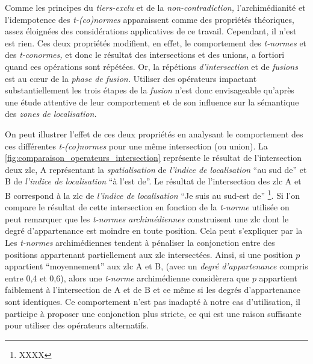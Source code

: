 Comme les principes du \emph{tiers-exclu} et de la
\emph{non-contradiction,} l'archimédianité et l'idempotence des
\emph{t-(co)normes} apparaissent comme des propriétés théoriques,
assez éloignées des considérations applicatives de ce
travail. Cependant, il n'est est rien. Ces deux propriétés modifient,
en effet, le comportement des \emph{t-normes} et des
\emph{t-conormes,} et donc le résultat des intersections et des
unions, a fortiori quand ces opérations sont répétées. Or, la
répétions \emph{d'intersection} et de \emph{fusions} est au cœur de la
\emph{phase de fusion.} Utiliser des opérateurs impactant
substantiellement les trois étapes de la \emph{fusion} n'est donc
envisageable qu'après une étude attentive de leur comportement et de
son influence sur la sémantique des \emph{zones de localisation.}


On peut illustrer l'effet de ces deux propriétés en analysant le
comportement des ces différentes \emph{t-(co)normes} pour une même
intersection (ou union). La
\autoref{fig:comparaison_operateurs_intersection} représente le
résultat de l'intersection deux \ac{zlc},
\textcolor{RdBu-9-1}{\textsf{A}} représentant la \emph{spatialisation}
de \emph{l'indice de localisation} \enquote{au sud de} et
\textcolor{RdBu-9-9}{\textsf{B}} de \emph{l'indice de localisation}
\enquote{à l'est de}. Le résultat de l'intersection des \ac{zlc}
\textcolor{RdBu-9-1}{\textsf{A}} et \textcolor{RdBu-9-9}{\textsf{B}}
correspond à la \ac{zlc} de \emph{l'indice de localisation}
\enquote{Je suis au sud-est de} \footnote{XXXX}. Si l'on compare le
résultat de cette intersection en fonction de la \emph{t-norme}
utilisée on peut remarquer que les \emph{t-normes archimédiennes}
construisent une \ac{zlc} dont le degré d'appartenance est moindre en
toute position. Cela peut s'expliquer par la
%
Les \emph{t-normes} archimédiennes tendent à pénaliser la conjonction
entre des positions appartenant partiellement aux \ac{zlc}
intersectées. Ainsi, si une position \(p\) appartient
\enquote{moyennement} aux \ac{zlc} \textcolor{RdBu-9-1}{\textsf{A}} et
\textcolor{RdBu-9-9}{\textsf{B}}, (\eg avec un \emph{degré
  d’appartenance} compris entre 0,4 et 0,6), alors une \emph{t-norme}
archimédienne considèrera que \(p\) appartient faiblement à
l'intersection de \textcolor{RdBu-9-1}{\textsf{A}} et de
\textcolor{RdBu-9-9}{\textsf{B}} et ce même si les degrés
d'appartenance sont identiques.
%
Ce comportement n'est pas
inadapté à notre cas d'utilisation, il participe à proposer une
conjonction plus stricte, ce qui est une raison suffisante pour
utiliser des opérateurs alternatifs.

